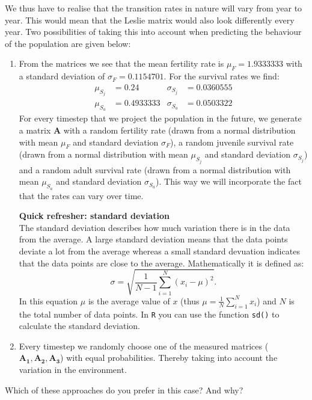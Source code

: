 \documentclass{article}\usepackage[]{graphicx}\usepackage[]{color}
\begin{document}
We thus have to realise that the transition rates in nature will vary from year to year. This would mean that the Leslie matrix would also look differently every year. Two possibilities of taking this into account when predicting the behaviour of the population are given below:
\begin{enumerate}
\item From the matrices we see that the mean fertility rate is $\mu_{F} = 1.9333333$ with a standard deviation of $\sigma_{F} = 0.1154701$. For the survival rates we find:
\begin{align*}
\mu_{S_j} &= 0.24 & \sigma_{S_j} &= 0.0360555\\
\mu_{S_a} &= 0.4933333 & \sigma_{S_a} &= 0.0503322
\end{align*}
For every timestep that we project the population in the future, we generate a matrix $\boldsymbol{A}$ with a random fertility rate (drawn from a normal distribution with mean $\mu_F$ and standard deviation $\sigma_F$), a random juvenile survival rate (drawn from a normal distribution with mean $\mu_{S_j}$ and standard deviation $\sigma_{S_j}$) and a random adult survival rate (drawn from a normal distribution with mean $\mu_{S_a}$ and standard deviation $\sigma_{S_a}$). This way we will incorporate the fact that the rates can vary over time.
\begin{mdframed}
\textbf{Quick refresher: standard deviation}\\
The standard deviation describes how much variation there is in the data from the average. A large standard deviation means that the data points deviate a lot from the average whereas a small standard devuation indicates that the data points are close to the average. Mathematically it is defined as:
\begin{equation*}
\sigma = \sqrt{\frac{1}{N-1}\sum_{i=1}^{N}{(x_i-\mu)^2}}.
\end{equation*}
In this equation $\mu$ is the average value of $x$ (thus $\mu=\frac{1}{N}\sum_{i=1}^{N}{x_i}$) and $N$ is the total number of data points. In \texttt{R} you can use the function \texttt{sd()} to calculate the standard deviation.
\end{mdframed}
\item Every timestep we randomly choose one of the measured matrices ($\boldsymbol{A_1,A_2,A_3}$) with equal probabilities. Thereby taking into account the variation in the environment.
\end{enumerate}
Which of these approaches do you prefer in this case? And why?
\end{document}
